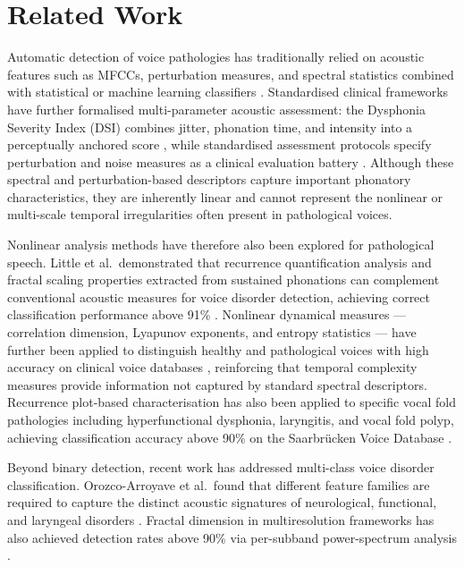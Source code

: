 \documentclass[conference]{IEEEtran}
\begin{document}
  \section{Related Work}
  \label{sec:related_work}

  Automatic detection of voice pathologies has traditionally relied on acoustic features such as MFCCs, perturbation measures, and spectral statistics combined with statistical or machine learning classifiers \cite{godino2006,alnasheri2017,rai2025}. Standardised clinical frameworks have further formalised multi-parameter acoustic assessment: the Dysphonia Severity Index (DSI) combines jitter, phonation time, and intensity into a perceptually anchored score \cite{wuyts2000}, while standardised assessment protocols specify perturbation and noise measures as a clinical evaluation battery \cite{dejonckere2001}. Although these spectral and perturbation-based descriptors capture important phonatory characteristics, they are inherently linear and cannot represent the nonlinear or multi-scale temporal irregularities often present in pathological voices.

  Nonlinear analysis methods have therefore also been explored for pathological speech. Little et al.\ demonstrated that recurrence quantification analysis and fractal scaling properties extracted from sustained phonations can complement conventional acoustic measures for voice disorder detection, achieving correct classification performance above 91\% \cite{little2007b}. Nonlinear dynamical measures — correlation dimension, Lyapunov exponents, and entropy statistics — have further been applied to distinguish healthy and pathological voices with high accuracy on clinical voice databases \cite{henriquez2009,little2007}, reinforcing that temporal complexity measures provide information not captured by standard spectral descriptors. Recurrence plot-based characterisation has also been applied to specific vocal fold pathologies including hyperfunctional dysphonia, laryngitis, and vocal fold polyp, achieving classification accuracy above 90\% on the Saarbrücken Voice Database \cite{krishnan2026}.

  Beyond binary detection, recent work has addressed multi-class voice disorder classification. Orozco-Arroyave et al.\ found that different feature families are required to capture the distinct acoustic signatures of neurological, functional, and laryngeal disorders \cite{orozco2015}. Fractal dimension in multiresolution frameworks has also achieved detection rates above 90\% via per-subband power-spectrum analysis \cite{ali2016,kumar2014}.
\end{document}
